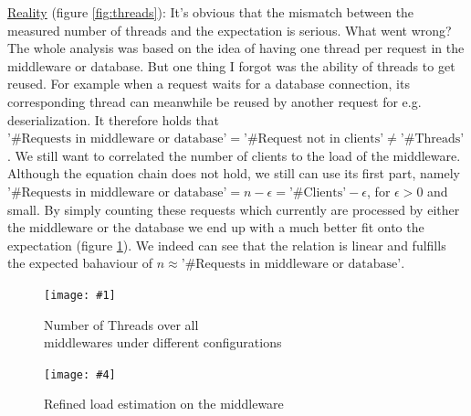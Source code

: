 \documentclass[11pt]{article}
\newcommand\TwoFig[6]{%
	\sbox\IBoxA{\texttt{[image: \#1]}}
	\sbox\IBoxB{\texttt{[image: \#4]}}%
	\ifdim\ht\IBoxA>\ht\IBoxB
	\setlength\IHeight{\ht\IBoxB}\else\setlength\IHeight{\ht\IBoxA}\fi%
	\begin{figure}[!htb]
		\minipage[t]{0.5\textwidth}\centering
		\texttt{[image: \#1]}
		\caption{#2}\label{#3}
		\endminipage \hfill
		\minipage[t]{0.5\textwidth}\centering
		\texttt{[image: \#4]}
		\caption{#5}\label{#6}
		\endminipage
	\end{figure}%
}
\begin{document}
\newline\underline{Reality} (figure \ref{fig:threads}): It's obvious that the mismatch between the measured number of threads and the expectation is serious. What went wrong? The whole analysis was based on the idea of having one thread per request in the middleware or database. But one thing I forgot was the ability of threads to get reused. For example when a request waits for a database connection, its corresponding thread can meanwhile be reused by another request for e.g. deserialization. It therefore holds that  $\text{'\#Requests in middleware or database'}=\text{'\#Request not in clients'}\neq\text{'\#Threads'}$. We still want to correlated the number of clients to the load of the middleware. Although the equation chain does not hold, we still can use its first part, namely $\text{'\#Requests in middleware or database'}=n-\epsilon=\text{'\#Clients'}-\epsilon$, for $\epsilon>0$ and small. By simply counting these requests which currently are processed by either the middleware or the database we end up with a much better fit onto the expectation (figure \ref{fig:refined_mw_load}). We indeed can see that the relation is linear and fulfills the expected bahaviour of $n\approx\text{'\#Requests in middleware or database'}$.

\TwoFig {figures/middleware/threads} {Number of Threads over all\\middlewares under different configurations}
		{fig:threads}
		{figures/middleware/req_vs_clients_on_mw} {Refined load estimation on the middleware} {fig:refined_mw_load}
\end{document}
